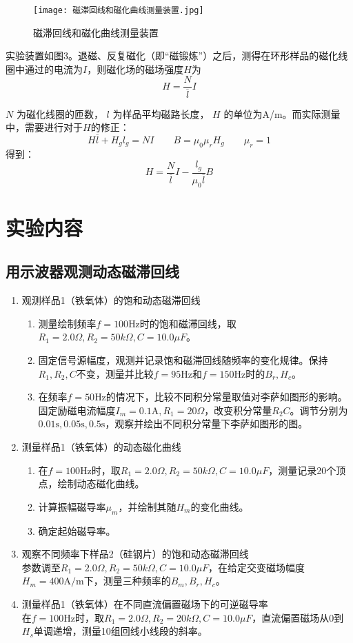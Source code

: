 \documentclass[11pt]{article}
\begin{document}
\begin{figure}[H]
    \centering
    \texttt{[image: 磁滞回线和磁化曲线测量装置.jpg]}
    \caption{磁滞回线和磁化曲线测量装置}
\end{figure}

实验装置如图3。退磁、反复磁化（即“磁锻炼”）之后，测得在环形样品的磁化线圈中通过的电流为$I$，则磁化场的磁场强度$H$为
\[
H = \frac{N}{\overline{l}}I
\]

$N$ 为磁化线圈的匝数， $l$ 为样品平均磁路长度， $H$ 的单位为A/m。而实际测量中，需要进行对于$H$的修正：
\[
H\overline{l} + H_g l_g = NI \qquad B = \mu_0\mu_rH_g \qquad \mu_r = 1
\]
得到：
\[
H = \frac{N}{\overline{l}}I-\frac{l_g}{\mu_0\overline{l}}B
\]

\section{实验内容}

\subsection{用示波器观测动态磁滞回线}

\begin{enumerate}
    \item 观测样品1（铁氧体）的饱和动态磁滞回线
    \begin{enumerate}
        \item 测量绘制频率$f=100\text{Hz}$时的饱和磁滞回线，取$R_1=2.0\Omega,R_2=50k\Omega,C=10.0\mu F$。
        \item 固定信号源幅度，观测并记录饱和磁滞回线随频率的变化规律。保持$R_1,R_2,C$不变，测量并比较$f=95\text{Hz}$和$f=150\text{Hz}$时的$B_r,H_c$。
        \item 在频率$f=50\text{Hz}$的情况下，比较不同积分常量取值对李萨如图形的影响。固定励磁电流幅度$I_m=0.1\text{A},R_1=20\Omega$，改变积分常量$R_2C$。调节分别为$0.01\text{s},0.05\text{s},0.5\text{s}$，观察并绘出不同积分常量下李萨如图形的图。
    \end{enumerate}
    \item 测量样品1（铁氧体）的动态磁化曲线
    \begin{enumerate}
        \item 在$f=100\text{Hz}$时，取$R_1=2.0\Omega,R_2=50k\Omega,C=10.0\mu F$，测量记录20个顶点，绘制动态磁化曲线。
        \item 计算振幅磁导率$\mu_m$，并绘制其随$H_m$的变化曲线。
        \item 确定起始磁导率。
    \end{enumerate}
    \item 观察不同频率下样品2（硅钢片）的饱和动态磁滞回线 \\
    参数调至$R_1=2.0\Omega,R_2=50k\Omega,C=10.0\mu F$，在给定交变磁场幅度$H_m=400\text{A}/\text{m}$下，测量三种频率的$B_m,B_r,H_c$。
    \item 测量样品1（铁氧体）在不同直流偏置磁场下的可逆磁导率 \\
    在$f=100\text{Hz}$时，取$R_1=2.0\Omega,R_2=20k\Omega,C=10.0\mu F$，直流偏置磁场从$0$到$H_s$单调递增，测量10组回线小线段的斜率。
\end{enumerate}
\end{document}
